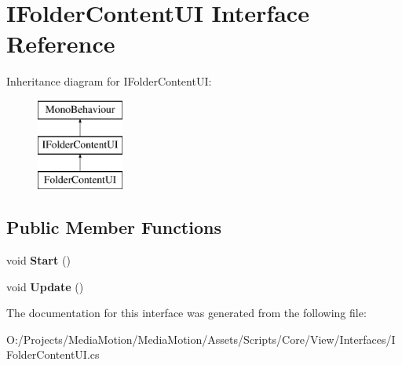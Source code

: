 \hypertarget{interface_i_folder_content_u_i}{\section{I\+Folder\+Content\+U\+I Interface Reference}
\label{interface_i_folder_content_u_i}
}
Inheritance diagram for I\+Folder\+Content\+U\+I\+:\begin{figure}[H]
\begin{center}
\leavevmode
\includegraphics[height=3.000000cm]{interface_i_folder_content_u_i}
\end{center}
\end{figure}
\subsection*{Public Member Functions}
\begin{DoxyCompactItemize}
\item 
\hypertarget{interface_i_folder_content_u_i_a0db9e3fd36e71be958c478729c1fa6b3}{void {\bfseries Start} ()}\label{interface_i_folder_content_u_i_a0db9e3fd36e71be958c478729c1fa6b3}

\item 
\hypertarget{interface_i_folder_content_u_i_a68e74eefabdf59e71c4665b2c5ec6be9}{void {\bfseries Update} ()}\label{interface_i_folder_content_u_i_a68e74eefabdf59e71c4665b2c5ec6be9}

\end{DoxyCompactItemize}


The documentation for this interface was generated from the following file\+:\begin{DoxyCompactItemize}
\item 
O\+:/\+Projects/\+Media\+Motion/\+Media\+Motion/\+Assets/\+Scripts/\+Core/\+View/\+Interfaces/I\+Folder\+Content\+U\+I.\+cs\end{DoxyCompactItemize}
